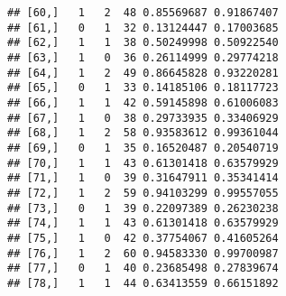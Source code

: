 \documentclass[]{article}
\begin{document}
\begin{verbatim}
## [60,]   1   2  48 0.85569687 0.91867407
## [61,]   0   1  32 0.13124447 0.17003685
## [62,]   1   1  38 0.50249998 0.50922540
## [63,]   1   0  36 0.26114999 0.29774218
## [64,]   1   2  49 0.86645828 0.93220281
## [65,]   0   1  33 0.14185106 0.18117723
## [66,]   1   1  42 0.59145898 0.61006083
## [67,]   1   0  38 0.29733935 0.33406929
## [68,]   1   2  58 0.93583612 0.99361044
## [69,]   0   1  35 0.16520487 0.20540719
## [70,]   1   1  43 0.61301418 0.63579929
## [71,]   1   0  39 0.31647911 0.35341414
## [72,]   1   2  59 0.94103299 0.99557055
## [73,]   0   1  39 0.22097389 0.26230238
## [74,]   1   1  43 0.61301418 0.63579929
## [75,]   1   0  42 0.37754067 0.41605264
## [76,]   1   2  60 0.94583330 0.99700987
## [77,]   0   1  40 0.23685498 0.27839674
## [78,]   1   1  44 0.63413559 0.66151892
\end{verbatim}
\end{document}
